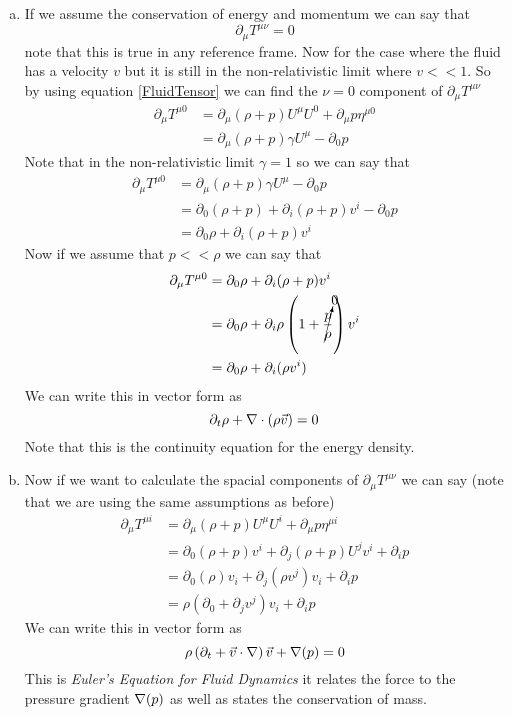 \documentclass[11pt]{article}
\numberwithin{equation}{section}
\begin{document}
\begin{enumerate}[(a)]
\item
If we assume the conservation of energy and momentum we can say that
$$\partial_{\mu}T^{\mu\nu} = 0$$
note that this is true in any reference frame. Now for the case where the fluid has a velocity $v$ but it is still in the non-relativistic limit where $v<<1$. So by using equation \ref{FluidTensor} we can find the $\nu=0$ component of $\partial_{\mu}T^{\mu\nu}$ 
\begin{align*}  
\partial_{\mu}T^{\mu0} &= \partial_{\mu}(\rho+p)U^{\mu}U^{0} + \partial_{\mu}p\eta^{\mu0}\\
&= \partial_{\mu}(\rho+p)\gamma U^{\mu} - \partial_{0}p
\end{align*}
Note that in the non-relativistic limit $\gamma = 1$ so we can say that
\begin{align*}  
\partial_{\mu}T^{\mu0} &= \partial_{\mu}(\rho+p)\gamma U^{\mu} - \partial_{0}p\\
&= \partial_{0}(\rho+p) + \partial_{i}(\rho+p)v^i - \partial_{0}p \\
&= \partial_{0}\rho + \partial_{i}(\rho+p) v^i
\end{align*}
Now if we assume that $p<<\rho$ we can say that 
\begin{align*}
\partial_{\mu}T^{\mu0} &= \partial_{0}\rho + \partial_{i}(\rho+p) v^i\\
&= \partial_{0}\rho + \partial_{i}\rho\left(1+\cancelto{0}{\frac{p}{\rho}}\right) v^i\\
&= \partial_{0}\rho + \partial_{i}(\rho v^i) 
\end{align*}
We can write this in vector form as
$$\partial_t\rho + \bold\nabla\cdot(\rho\vec{v}) = 0$$
Note that this is the continuity equation for the energy density.

\item
Now if we want to calculate the spacial components of $\partial_{\mu}T^{\mu\nu}$ we can say (note that we are using the same assumptions as before)
\begin{align*}  
\partial_{\mu}T^{\mu i} &= \partial_{\mu}(\rho+p)U^{\mu}U^{i} + \partial_{\mu}p\eta^{\mu i}\\
 &= \partial_{0}(\rho+p)v^{i} + \partial_{j}(\rho+p)U^{j}v^{i}  + \partial_{i}p\\
 &= \partial_{0}(\rho)v_{i} + \partial_{j}(\rho v^{j})v_{i}  + \partial_{i}p\\
 &= \rho\left(\partial_{0} + \partial_{j}v^{j}\right)v_{i}  + \partial_{i}p
\end{align*}  
We can write this in vector form as
$$\rho\left(\partial_t + \vec{v}\cdot\bold\nabla\right)\vec{v} + \bold\nabla(p) = 0$$
This is \emph{Euler's Equation for Fluid Dynamics} it relates the force to the pressure gradient $\bold\nabla(p)$ as well as states the conservation of mass.
\end{enumerate}
\end{document}
